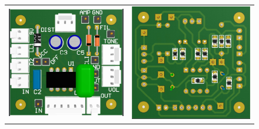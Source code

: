 \begin{figure}[H]
    \centering
    \begin{tabular}{c c}
        \includegraphics[]{../EJ5/Recursos/3d_top.PNG} &
        \includegraphics[]{../EJ5/Recursos/3d_bottom.PNG} \\

\end{tabular}
\end{figure}
